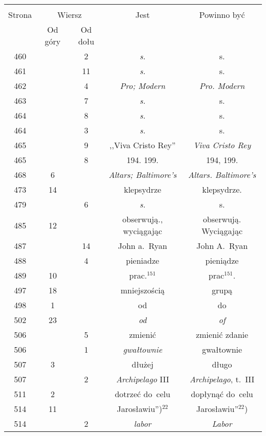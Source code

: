 \documentclass[a4paper,11pt]{article}
\begin{document}
\begin{center}
  \begin{tabular}{|c|c|c|c|c|}
    \hline
    & \multicolumn{2}{c|}{} & & \\
    Strona & \multicolumn{2}{c|}{Wiersz} & Jest
                              & Powinno być \\ \cline{2-3}
    & Od góry & Od dołu & & \\
    \hline
    460 & &  2 & \emph{s.} & s. \\
    461 & & 11 & \emph{s.} & s. \\
    462 & &  4 & \emph{Pro; Modern} & \emph{Pro. Modern} \\
    463 & &  7 & \emph{s.} & s. \\
    464 & &  8 & \emph{s.} & s. \\
    464 & &  3 & \emph{s.} & s. \\
    465 & &  9 & ,,Viva Cristo Rey'' & \emph{Viva Cristo Rey} \\
    465 & &  8 & 194. 199. & 194, 199. \\
    468 &  6 & & \emph{Altars; Baltimore's} & \emph{Altars. Baltimore's} \\
    473 & 14 & & klepsydrze & klepsydrze. \\
    479 & &  6 & \emph{s.} & s. \\
    485 & 12 & & obserwują., wyciągając & obserwują. Wyciągając \\
    487 & & 14 & John a.~Ryan & John A.~Ryan \\
    488 & &  4 & pieniadze & pieniądze \\
    489 & 10 & & prac.$^{151}$ & prac$^{151}$. \\
    497 & 18 & & mniejszością & grupą \\
    498 &  1 & & od & do \\
    502 & 23 & & \emph{od} & \emph{of} \\
    506 & &  5 & zmienić & zmienić zdanie \\
    506 & &  1 & \emph{gwałtownie} & gwałtownie \\
    507 &  3 & & dłużej & długo \\
    507 & &  2 & \emph{Archipelago} III & \emph{Archipelago}, t.~III \\
    511 &  2 & & dotrzeć do~celu & dopłynąć do~celu \\
    514 & 11 & & %
                 Jarosławiu'')$^{ 22 }$  %
           & Jarosławiu''$^{ 22 }$) \\
    514 & &  2 & \emph{labor} & \emph{Labor} \\

\end{tabular}
\end{center}
\end{document}
